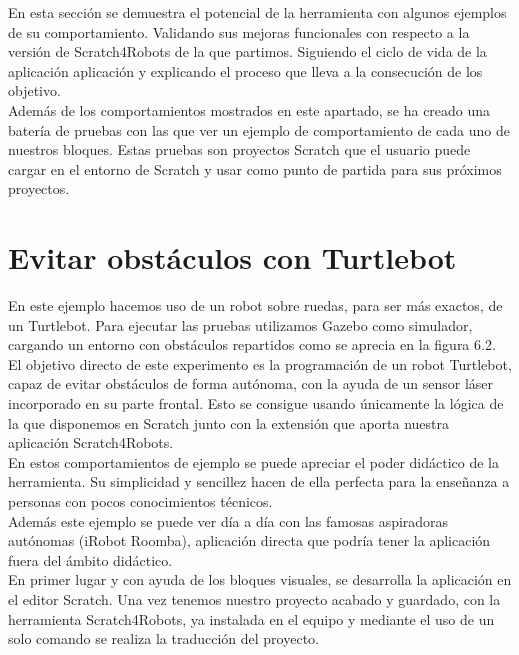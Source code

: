 En esta sección se demuestra el potencial de la herramienta con algunos ejemplos de su comportamiento. Validando  sus mejoras funcionales con respecto a la versión de Scratch4Robots de la que partimos. Siguiendo el ciclo de vida de la aplicación aplicación y explicando el proceso que lleva a la consecución de los objetivo.\\

Además de los comportamientos mostrados en este apartado, se ha creado una batería de pruebas con las que ver un ejemplo de comportamiento de cada uno de nuestros bloques. Estas pruebas son proyectos Scratch que el usuario puede cargar en el entorno de Scratch y usar como punto de partida para sus próximos proyectos.

\section{Evitar obstáculos con Turtlebot}
\label{sec:evitar-obstaculos}

En este ejemplo hacemos uso de un robot sobre ruedas, para ser más exactos, de un Turtlebot. Para ejecutar las pruebas utilizamos Gazebo como simulador, cargando un entorno con obstáculos repartidos como se aprecia en la figura 6.2.\\

El objetivo directo de este experimento es la programación de un robot Turtlebot, capaz de evitar obstáculos de forma autónoma, con la ayuda de un sensor láser incorporado en su parte frontal. Esto se consigue usando únicamente la lógica de la que disponemos en Scratch junto con la extensión que aporta nuestra aplicación Scratch4Robots.\\

En estos comportamientos de ejemplo se puede apreciar el poder didáctico de la herramienta. Su simplicidad y sencillez hacen de ella perfecta para la enseñanza a personas con pocos conocimientos técnicos.\\

Además este ejemplo se puede ver día a día con las famosas aspiradoras autónomas (iRobot Roomba), aplicación directa que podría tener la aplicación fuera del ámbito didáctico.\\

En primer lugar y con ayuda de los bloques visuales, se desarrolla la aplicación en el editor Scratch. Una vez tenemos nuestro proyecto acabado y guardado, con la herramienta Scratch4Robots, ya instalada en el equipo y mediante el uso de un solo comando se realiza la traducción del proyecto.\\

